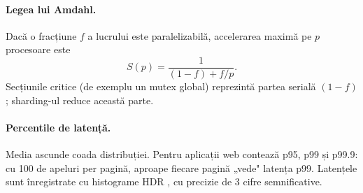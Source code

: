 \paragraph{Legea lui Amdahl.} Dacă o fracțiune $f$ a lucrului este paralelizabilă, accelerarea maximă pe
$p$ procesoare este \cite{amdahl}
\begin{equation}
  S(p) = \frac{1}{(1-f) + f/p}.
  \label{eq:amdahl}
\end{equation}
Secțiunile critice (de exemplu un mutex global) reprezintă partea serială $(1-f)$; sharding-ul reduce
această parte.

\paragraph{Percentile de latență.} Media ascunde coada distribuției. Pentru aplicații web contează p95,
p99 și p99.9: cu 100 de apeluri per pagină, aproape fiecare pagină „vede" latența p99. Latențele sunt
înregistrate cu histograme HDR \cite{tene}, cu precizie de 3 cifre semnificative.
